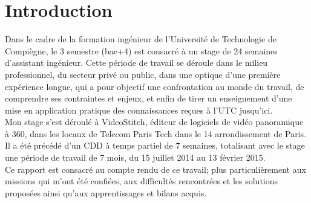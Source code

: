\chapter*{Introduction}
Dans le cadre de la formation ingénieur de l'Université de Technologie de Compiègne,
le 3 semestre (bac+4) est consacré à un stage de 24 semaines d'assistant ingénieur.
Cette période de travail se déroule dans le milieu professionnel, du secteur
privé ou public, dans une optique d'une première expérience longue, qui a pour
objectif une confrontation au monde du travail, de comprendre ses contraintes et 
enjeux, et enfin de tirer un enseignement d'une mise en application pratique des
connaissances reçues à l'UTC jusqu'ici.\\
\newline
Mon stage s'est déroulé à VideoStitch, éditeur de logiciels de vidéo panoramique
à 360\degree, dans les locaux de Telecom Paris Tech dans le 14 arrondissement de Paris. 
Il a été précédé d'un CDD à temps partiel de 7 semaines, totalisant avec le stage une période 
de travail de 7 mois, du 15 juillet 2014 au 13 février 2015.\\
\newline
Ce rapport est consacré au compte rendu de ce travail; plus particulièrement aux
missions qui m'ont été confiées, aux difficultés rencontrées et les solutions
proposées ainsi qu'aux apprentissages et bilans acquis.

